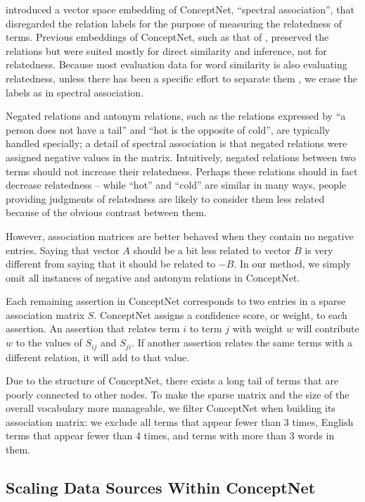 \documentclass[letterpaper]{article}
\begin{document}
 introduced a vector space embedding of ConceptNet,
``spectral association'', that disregarded the relation labels for the purpose
of measuring the relatedness of terms. Previous embeddings of ConceptNet, such
as that of , preserved the relations but were
suited mostly for direct similarity and inference, not for relatedness. Because
most evaluation data for word similarity is also evaluating relatedness, unless
there has been a specific effort to separate them \cite{agirre2009similarity},
we erase the labels as in spectral association.

Negated relations and antonym relations, such as the relations expressed by
``a person does not have a tail'' and ``hot is the opposite of cold'', are
typically handled specially; a detail of spectral association is that negated
relations were assigned negative values in the matrix. Intuitively, negated
relations between two terms should not increase their relatedness. Perhaps
these relations should in fact decrease relatedness -- while ``hot'' and
``cold'' are similar in many ways, people providing judgments of relatedness
are likely to consider them less related because of the obvious contrast
between them.

However, association matrices are better behaved when they contain no negative
entries. Saying that vector $A$ should be a bit less related to vector
$B$ is very different from saying that it should be related to $-B$.
In our method, we simply omit all instances of negative and antonym
relations in ConceptNet.

Each remaining assertion in ConceptNet corresponds to two entries in a sparse
association matrix $S$. ConceptNet assigns a confidence score, or weight, to
each assertion. An assertion that relates term $i$ to term $j$ with weight $w$
will contribute $w$ to the values of $S_{ij}$ and $S_{ji}$. If another
assertion relates the same terms with a different relation, it will add to that
value.

Due to the structure of ConceptNet, there exists a long tail of terms that are
poorly connected to other nodes. To make the sparse matrix and the size of the
overall vocabulary more manageable, we filter ConceptNet when building its
association matrix: we exclude all terms that appear fewer than 3 times, English
terms that appear fewer than 4 times, and terms with more than 3 words in them.

\subsection{Scaling Data Sources Within ConceptNet}
\end{document}
